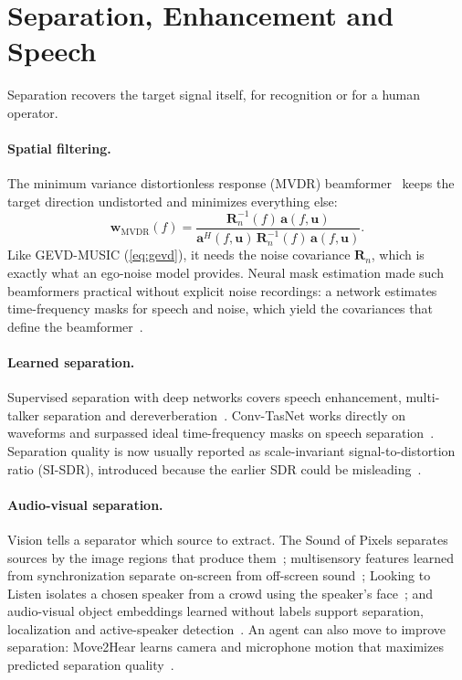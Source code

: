 \section{Separation, Enhancement and Speech}
\label{sec:sep}

Separation recovers the target signal itself, for recognition or for a human operator.

\paragraph{Spatial filtering.}
The minimum variance distortionless response (MVDR) beamformer~\cite{capon1969mvdr} keeps the target direction undistorted and minimizes everything else:
\begin{equation}
\mathbf{w}_{\text{MVDR}}(f)=\frac{\mathbf{R}_n^{-1}(f)\,\mathbf{a}(f,\mathbf{u})}{\mathbf{a}^{H}(f,\mathbf{u})\,\mathbf{R}_n^{-1}(f)\,\mathbf{a}(f,\mathbf{u})}.
\label{eq:mvdr}
\end{equation}
Like GEVD-MUSIC (\cref{eq:gevd}), it needs the noise covariance $\mathbf{R}_n$, which is exactly what an ego-noise model provides.
Neural mask estimation made such beamformers practical without explicit noise recordings: a network estimates time-frequency masks for speech and noise, which yield the covariances that define the beamformer~\cite{heymann2016mask}.

\paragraph{Learned separation.}
Supervised separation with deep networks covers speech enhancement, multi-talker separation and dereverberation~\cite{wang2018overview}.
Conv-TasNet works directly on waveforms and surpassed ideal time-frequency masks on speech separation~\cite{luo2019convtasnet}.
Separation quality is now usually reported as scale-invariant signal-to-distortion ratio (SI-SDR), introduced because the earlier SDR could be misleading~\cite{leroux2019sisdr}.

\paragraph{Audio-visual separation.}
Vision tells a separator which source to extract.
The Sound of Pixels separates sources by the image regions that produce them~\cite{zhao2018pixels}; multisensory features learned from synchronization separate on-screen from off-screen sound~\cite{owens2018multisensory}; Looking to Listen isolates a chosen speaker from a crowd using the speaker's face~\cite{ephrat2018looking}; and audio-visual object embeddings learned without labels support separation, localization and active-speaker detection~\cite{afouras2020avobjects}.
An agent can also move to improve separation: Move2Hear learns camera and microphone motion that maximizes predicted separation quality~\cite{majumder2021move2hear}.

